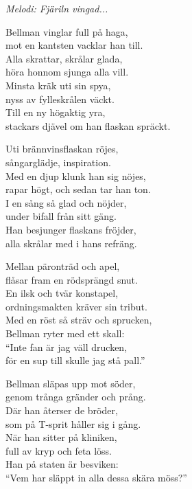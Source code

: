{\footnotesize\textit{Melodi: Fjäriln vingad...}}\par
\vspace{10pt}
Bellman vinglar full på haga,\\
mot en kantsten vacklar han till.\\
Alla skrattar, skrålar glada,\\
höra honnom sjunga alla vill.\\
Minsta kräk uti sin spya,\\
nyss av fylleskrålen väckt.\\
Till en ny högaktig yra,\\
stackars djävel om han flaskan spräckt.\par
\vspace{10pt}
Uti brännvinsflaskan röjes,\\
sångarglädje, inspiration.\\
Med en djup klunk han sig nöjes,\\
rapar högt, och sedan tar han ton.\\
I en sång så glad och nöjder,\\
under bifall från sitt gäng.\\
Han besjunger flaskans fröjder,\\
alla skrålar med i hans refräng.\par
\vspace{10pt}
Mellan päronträd och apel,\\
flåsar fram en rödsprängd snut.\\
En ilsk och tvär konstapel,\\
ordningsmakten kräver sin tribut.\\
Med en röst så sträv och sprucken,\\
Bellman ryter med ett skall:\\
``Inte fan är jag väll drucken,\\
för en sup till skulle jag stå pall.''\par
\newpage
Bellman släpas upp mot söder,\\
genom trånga gränder och prång.\\
Där han återser de bröder,\\
som på T-sprit håller sig i gång.\\
När han sitter på kliniken,\\
full av kryp och feta löss.\\
Han på staten är besviken:\\
``Vem har släppt in alla dessa skära möss?''

